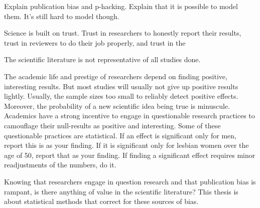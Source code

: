 \documentclass[english]{article}
\begin{document}
Explain publication bias and p-hacking.
Explain that it is possible to model them.
It's still hard to model though.


Science is built on trust. Trust in researchers to honestly report their results, trust in reviewers to do their job properly, and trust in the 

The scientific literature is not representative of all studies done. 

The academic life and prestige of researchers depend on finding positive, interesting results. But most studies will usually not give up positive results lightly. Usually, the sample sizes too small to reliably detect positive effects. Moreover, the probability of a new scientific idea being true is minuscule. Academics have a strong incentive to engage in questionable research practices to camouflage their null-results as positive and interesting. Some of these questionable practices are statistical. If an effect is significant only for men, report this is as your finding. If it is significant only for lesbian women over the age of 50, report that as your finding. If finding a significant effect requires minor readjustments of the numbers, do it.

Knowing that researchers engage in question research and that publication bias is rampant, is there anything of value in the scientific literature? This thesis is about statistical methods that correct for these sources of bias. 
\end{document}
